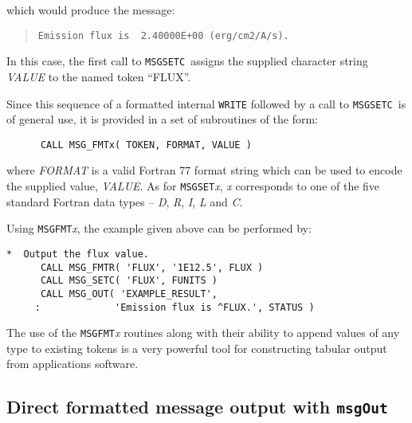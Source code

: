 \documentclass[twoside,11pt]{article}
\newcommand{\xlabel}[1]{}
\renewcommand{\_}{\texttt{\symbol{95}}}
\newcommand{\func}[1]{\texttt{#1}}
\newcommand{\farg}[1]{\textit{#1}}
\newcommand{\msgout}{\func{msgOut}}
\newcommand{\fmsgsetc}{\func{MSG\_SETC}}
\begin{document}
which would produce the message:

\begin {quote}
\begin {small}
\begin{verbatim}
Emission flux is  2.40000E+00 (erg/cm2/A/s).
\end{verbatim}
\end {small}
\end {quote}

In this case, the first call to \fmsgsetc\ assigns the supplied character
string \farg{VALUE} to the named token ``FLUX''.

Since this sequence of a formatted internal \func{WRITE} followed by a call to
\fmsgsetc\ is of general use, it is provided in a set of subroutines of the
form:

\begin {small}
\begin{verbatim}
      CALL MSG_FMTx( TOKEN, FORMAT, VALUE )
\end{verbatim}
\end {small}

where \farg{FORMAT} is a valid Fortran 77 format string which can be used to
encode the supplied value, \farg{VALUE}.
As for \func{MSG\_SET}\textit{x}, \textit{x} corresponds to one of the five standard
Fortran data types -- \textit{D}, \textit{R}, \textit{I}, \textit{L} and \textit{C}.

Using \func{MSG\_FMT}\textit{x}, the example given above can be performed by:

\begin {small}
\begin{verbatim}
*  Output the flux value.
      CALL MSG_FMTR( 'FLUX', '1E12.5', FLUX )
      CALL MSG_SETC( 'FLUX', FUNITS )
      CALL MSG_OUT( 'EXAMPLE_RESULT',
     :             'Emission flux is ^FLUX.', STATUS )
\end{verbatim}
\end {small}

The use of the \func{MSG\_FMT}\textit{x} routines along with their ability to append
values of any type to existing tokens is a very powerful tool for constructing
tabular output from applications software.

\subsection{\xlabel{direct_formatted_message_output}Direct formatted message
output with \msgout}
\end{document}
